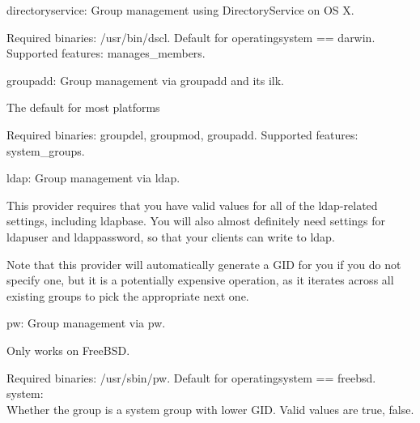     directoryservice: Group management using DirectoryService on OS X.

    Required binaries: /usr/bin/dscl. Default for operatingsystem == darwin. Supported features: manages\_members.

    groupadd: Group management via groupadd and its ilk.

    The default for most platforms

    Required binaries: groupdel, groupmod, groupadd. Supported features: system\_groups.

    ldap: Group management via ldap.

    This provider requires that you have valid values for all of the ldap-related settings, including ldapbase. You will also almost definitely need settings for ldapuser and ldappassword, so that your clients can write to ldap.

    Note that this provider will automatically generate a GID for you if you do not specify one, but it is a potentially expensive operation, as it iterates across all existing groups to pick the appropriate next one.

    pw: Group management via pw.

    Only works on FreeBSD.

    Required binaries: /usr/sbin/pw. Default for operatingsystem == freebsd.
%
system:\\
Whether the group is a system group with lower GID. Valid values are true, false.\\\\
